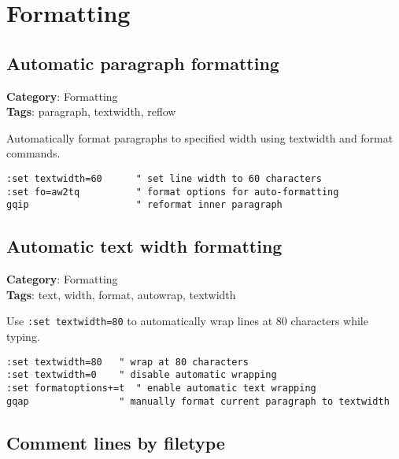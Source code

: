 {{{{{\chapter{Formatting}
\section{Automatic paragraph formatting}

\textbf{Category}: Formatting\\ \textbf{Tags}: paragraph, textwidth, reflow
\vspace{0.5cm}

Automatically format paragraphs to specified width using textwidth and format commands.

\begin{Exa*}{}
\begin{Verbatim}[fontsize=\footnotesize, breaklines, breakanywhere]
:set textwidth=60      " set line width to 60 characters
:set fo=aw2tq          " format options for auto-formatting
gqip                   " reformat inner paragraph
\end{Verbatim}
\end{Exa*}

\section{Automatic text width formatting}

\textbf{Category}: Formatting\\ \textbf{Tags}: text, width, format, autowrap, textwidth
\vspace{0.5cm}

Use {\footnotesize \Verb§:set textwidth=80§} to automatically wrap lines at 80 characters while typing.

\begin{Exa*}{}
\begin{Verbatim}[fontsize=\footnotesize, breaklines, breakanywhere]
:set textwidth=80   " wrap at 80 characters
:set textwidth=0    " disable automatic wrapping
:set formatoptions+=t  " enable automatic text wrapping
gqap                " manually format current paragraph to textwidth
\end{Verbatim}
\end{Exa*}

\section{Comment lines by filetype}

}}}}}
